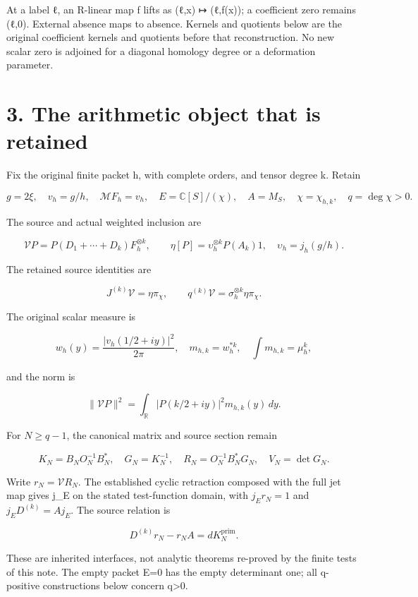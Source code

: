 \documentclass[
  11pt,
]{article}
\begin{document}
At a label ℓ, an R-linear map f lifts as (ℓ,x) ↦ (ℓ,f(x)); a coefficient
zero remains (ℓ,0). External absence maps to absence. Kernels and
quotients below are the original coefficient kernels and quotients
before that reconstruction. No new scalar zero is adjoined for a
diagonal homology degree or a deformation parameter.

\section{3. The arithmetic object that is
retained}\label{the-arithmetic-object-that-is-retained}

Fix the original finite packet h, with complete orders, and tensor
degree k. Retain

\[
g=2\xi,\quad v_h=g/h,\quad \mathcal MF_h=v_h,
\quad E=\mathbb C[S]/(\chi),\quad A=M_S,
\quad\chi=\chi_{h,k},\quad q=\deg\chi>0.
\tag{5}
\]

The source and actual weighted inclusion are

\[
\mathcal V P=P(D_1+\cdots+D_k)F_h^{\otimes k},
\qquad
\eta[P]=\upsilon_h^{\otimes k}P(A_k)1,
\quad \upsilon_h=j_h(g/h).
\tag{6}
\]

The retained source identities are

\[
J^{(k)}\mathcal V=\eta\pi_\chi,
\qquad q^{(k)}\mathcal V
 =\sigma_h^{\otimes k}\eta\pi_\chi.
\tag{7}
\]

The original scalar measure is

\[
w_h(y)=\frac{|v_h(1/2+iy)|^2}{2\pi},\quad
m_{h,k}=w_h^{*k},\quad\int m_{h,k}=\mu_h^k,
\tag{8}
\]

and the norm is

\[
\|\mathcal VP\|^2
 =\int_{\mathbb R}|P(k/2+iy)|^2m_{h,k}(y)\,dy.
\tag{9}
\]

For \(N\ge q-1\), the canonical matrix and source section remain

\[
K_N=B_NO_N^{-1}B_N^*,\quad G_N=K_N^{-1},\quad
R_N=O_N^{-1}B_N^*G_N,\quad V_N=\det G_N.
\tag{10}
\]

Write \(r_N=\mathcal V R_N\). The established cyclic retraction composed
with the full jet map gives j\_E on the stated test-function domain,
with \(j_Er_N=1\) and \(j_ED^{(k)}=Aj_E\). The source relation is

\[
D^{(k)}r_N-r_NA=dK_N^{\mathrm{prim}}.
\tag{11}
\]

These are inherited interfaces, not analytic theorems re-proved by the
finite tests of this note. The empty packet E=0 has the empty
determinant one; all q-positive constructions below concern
q\textgreater0.
\end{document}
